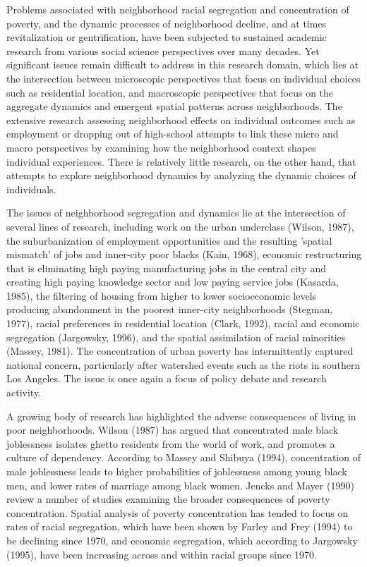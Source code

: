 \documentclass[12pt,a4paper]{article}
\begin{document}
Problems associated with neighborhood racial segregation and
concentration of poverty, and the dynamic processes of
neighborhood decline, and at times revitalization or
gentrification, have been subjected to sustained academic research
from various social science perspectives over many decades. Yet
significant issues remain difficult to address in this research
domain, which lies at the intersection between microscopic
perspectives that focus on individual choices such as residential
location, and macroscopic perspectives that focus on the aggregate
dynamics and emergent spatial patterns across neighborhoods.  The
extensive research assessing neighborhood effects on individual
outcomes such as employment or dropping out of high-school
attempts to link these micro and macro perspectives by examining
how the neighborhood context shapes individual experiences.  There
is relatively little research, on the other hand, that attempts to
explore neighborhood dynamics by analyzing the dynamic choices of
individuals.

The issues of neighborhood segregation and dynamics lie at the
intersection of several lines of research, including work on the
urban underclass (Wilson, 1987), the suburbanization of employment
opportunities and the resulting 'spatial mismatch' of jobs and
inner-city poor blacks (Kain, 1968), economic restructuring that
is eliminating high paying manufacturing jobs in the central city
and creating high paying knowledge sector and low paying service
jobs (Kasarda, 1985), the filtering of housing from higher to
lower socioeconomic levels producing abandonment in the poorest
inner-city neighborhoods (Stegman, 1977), racial preferences in
residential location (Clark, 1992), racial and economic
segregation (Jargowsky, 1996), and the spatial assimilation of
racial minorities (Massey, 1981). The concentration of urban
poverty has intermittently captured national concern, particularly
after watershed events such as the riots in southern Los Angeles.
The issue is once again a focus of policy debate and research
activity.

A growing body of research has highlighted the adverse
consequences of living in poor neighborhoods. Wilson (1987) has
argued that concentrated male black joblessness isolates ghetto
residents from the world of work, and promotes a culture of
dependency. According to Massey and Shibuya (1994), concentration
of  male joblessness leads to higher probabilities of joblessness
among young black men, and lower rates of marriage among black
women. Jencks and Mayer (1990) review a number of studies
examining the broader consequences of poverty concentration.
Spatial analysis of poverty concentration has tended to focus on
rates of racial segregation, which have been shown by Farley and
Frey (1994) to be declining since 1970, and economic segregation,
which according to Jargowsky (1995), have been increasing across
and within racial groups since 1970.
\end{document}
